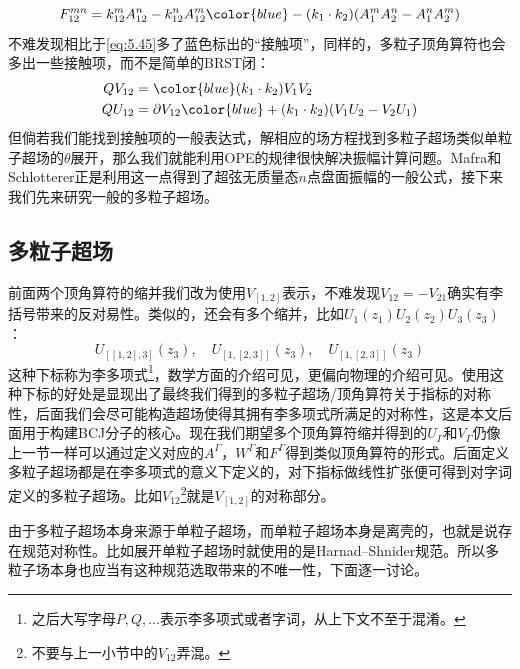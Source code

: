 \begin{equation}
	F_{12}^{mn}=k_{12}^mA_{12}^n-k_{12}^nA_{12}^m{\color{blue}-(k_1\cdot k_2)(A_1^mA_2^n-A_1^nA_2^m)}
\end{equation}
不难发现相比于\ref{eq:5.45}多了蓝色标出的“接触项”，同样的，多粒子顶角算符也会多出一些接触项，而不是简单的BRST闭：
\begin{equation}
	\label{eq:6.26}
	\begin{aligned}
		QV_{12}&={\color{blue}(k_1\cdot k_2)V_1V_2}\\
		QU_{12}&=\partial V_{12}{\color{blue}+(k_1\cdot k_2)(V_1U_2-V_2U_1)}
	\end{aligned}
\end{equation}
但倘若我们能找到接触项的一般表达式，解相应的场方程找到多粒子超场类似单粒子超场的$\theta$展开，那么我们就能利用OPE的规律很快解决振幅计算问题。Mafra和Schlotterer正是利用这一点得到了超弦无质量态$n$点盘面振幅的一般公式\cite{Mafra:2011nv,Mafra:2011nw}，接下来我们先来研究一般的多粒子超场。
\subsection{多粒子超场}
前面两个顶角算符的缩并我们改为使用$V_{[1,2]}$表示，不难发现$V_{12} = -V_{21}$确实有李括号带来的反对易性。类似的，还会有多个缩并，比如$U_1(z_1)U_2(z_2)U_3(z_3)$：
\begin{equation}
	U_{[[1,2],3]}(z_3),\quad U_{[1,[2,3]]}(z_3),\quad U_{[1,[2,3]]}(z_3)
\end{equation}
这种下标称为李多项式\footnote{之后大写字母$P,Q,\ldots$表示李多项式或者字词，从上下文不至于混淆。}，数学方面的介绍可见\cite{REUTENAUER2003887, free_lie,lothaire1997combinatorics}，更偏向物理的介绍可见\cite{Frost:2020eoa}。使用这种下标的好处是显现出了最终我们得到的多粒子超场/顶角算符关于指标的对称性，后面我们会尽可能构造超场使得其拥有李多项式所满足的对称性，这是本文后面用于构建BCJ分子的核心。现在我们期望多个顶角算符缩并得到的$U_\Gamma$和$V_{\Gamma}$仍像上一节一样可以通过定义对应的$A^\Gamma$，$W^\Gamma$和$F^\Gamma$得到类似顶角算符的形式。后面定义多粒子超场都是在李多项式的意义下定义的，对下指标做线性扩张便可得到对字词定义的多粒子超场。比如$V_{12}$\footnote{不要与上一小节中的$V_{12}$弄混。}就是$V_{[1,2]}$的对称部分。

由于多粒子超场本身来源于单粒子超场，而单粒子超场本身是离壳的，也就是说存在规范对称性。比如展开单粒子超场时就使用的是Harnad–Shnider规范。所以多粒子场本身也应当有这种规范选取带来的不唯一性，下面逐一讨论。
